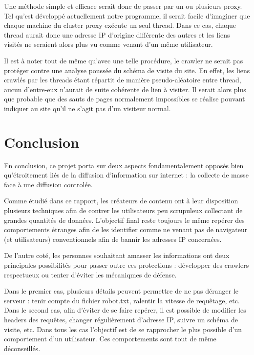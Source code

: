 \documentclass[hideweeklyreports,noposter]{polytech/polytech}
\begin{document}
	    Une méthode simple et efficace serait donc de passer par un ou plusieurs proxy.
	    Tel qu'est développé actuellement notre programme, il serait facile d'imaginer que chaque machine du cluster proxy exécute un seul thread.
	    Dans ce cas, chaque thread aurait donc une adresse IP d'origine différente des autres et les liens visités ne seraient alors plus vu comme venant d'un même utilisateur.
	    
	    
	    Il est à noter tout de même qu'avec une telle procédure, le crawler ne serait pas protéger contre une analyse poussée du schéma de visite du site.
	    En effet, les liens crawlés par les threads étant répartit de manière pseudo-aléatoire entre thread, aucun d'entre-eux n'aurait de suite cohérente de lien à visiter.
	    Il serait alors plus que probable que des sauts de pages normalement impossibles se réalise pouvant indiquer au site qu'il ne s'agit pas d'un visiteur normal.
		

\part{Conclusion}

    En conclusion, ce projet porta sur deux aspects fondamentalement opposés bien qu'étroitement liés de la diffusion d'information sur internet : la collecte de masse face à une diffusion controlée.
    
    Comme étudié dans ce rapport, les créateurs de contenu ont à leur disposition plusieurs techniques afin de contrer les utilisateurs peu scrupuleux collectant de grandes quantités de données.
    L'objectif final reste toujours le même repérer des comportements étranges afin de les identifier comme ne venant pas de navigateur (et utilisateurs) conventionnels afin de bannir les adresses IP concernées.
    
    
    De l'autre coté, les personnes souhaitant amasser les informations ont deux principales possibilités pour passer outre ces protections : développer des crawlers respectueux ou tenter d'éviter les mécaniqmes de défense.
    
    Dans le premier cas, plusieurs détails peuvent permettre de ne pas déranger le serveur : tenir compte du fichier robot.txt, ralentir la vitesse de requêtage, etc.
    Dans le second cas, afin d'éviter de se faire repérer, il est possible de modifier les headers des requêtes, changer régulièrement d'adresse IP, suivre un schéma de visite, etc.
    Dans tous les cas l'objectif est de se rapprocher le plus possible d'un comportement d'un utilisateur.
    Ces comportements sont tout de même déconseillés.

\end{document}
